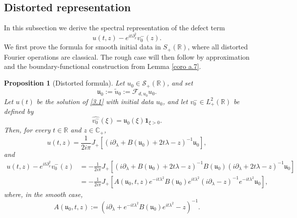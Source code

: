 \documentclass[10pt]{article}
\newtheorem{proposition}[theorem]{Proposition}
\numberwithin{equation}{section}
\numberwithin{theorem}{section}
\begin{document}
\subsection{Distorted representation}

In this subsection we derive the spectral representation of the defect term
\[
u(t,z)-e^{it\partial_x^2}v_0^-(z).
\]
We first prove the formula for smooth initial data in $S_+(\mathbb R)$, where all distorted Fourier
operations are classical. The rough case will then follow by approximation and the
boundary-functional construction from Lemma \ref{coro a.7}.
\begin{proposition}[Distorted formula]
\label{prop:smooth_defect_formula}
Let \(u_0\in\mathcal S_+(\mathbb R)\), and set
\[
\mathfrak u_0:=\widetilde u_0:=\mathcal F_{d,u_0}u_0.
\]
Let \(u(t)\) be the solution of \eqref{3.1} with initial data \(u_0\), and let
\(v_0^-\in L^2_+(\mathbb R)\) be defined by
\[
\widehat{v_0^-}(\xi)=\mathfrak u_0(\xi)\mathbf 1_{\xi>0}.
\]
Then, for every \(t\in\mathbb R\) and \(z\in\mathbb C_+\),
\begin{equation}
\label{3.21}
u(t,z)
=
\frac1{2i\pi}
J_+\left[
(i\partial_\lambda+B(\mathfrak u_0)+2t\lambda-z)^{-1}\mathfrak u_0
\right],
\end{equation}
and
\begin{equation}
\label{3.22}
\begin{aligned}
u(t,z)-e^{it\partial_x^2}v_0^-(z)
&=
-\frac1{2i\pi}
J_+\left[
(i\partial_\lambda+B(\mathfrak u_0)+2t\lambda-z)^{-1}
B(\mathfrak u_0)
(i\partial_\lambda+2t\lambda-z)^{-1}
\mathfrak u_0
\right] \\
&=
-\frac1{2i\pi}
J_+\left[
A(\mathfrak u_0,t,z)
e^{-it\lambda^2}
B(\mathfrak u_0)
e^{it\lambda^2}
(i\partial_\lambda-z)^{-1}
e^{-it\lambda^2}\mathfrak u_0
\right],
\end{aligned}
\end{equation}
where, in the smooth case,
\begin{equation}
\label{3.23}
A(\mathfrak u_0,t,z)
:=
\left(
i\partial_\lambda
+
e^{-it\lambda^2}B(\mathfrak u_0)e^{it\lambda^2}
-z
\right)^{-1}.
\end{equation}
\end{proposition}
\end{document}
